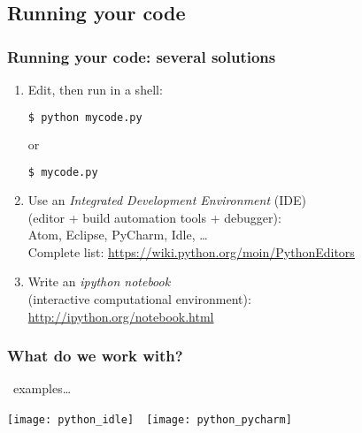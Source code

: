 \subsection{Running your code}
\begin{frame}[fragile, t]
\frametitle{Running your code: several solutions}

\begin{enumerate}
\item<1-> Edit, then run in a shell:
\begin{lstlisting}[language=bash]
$ python mycode.py
\end{lstlisting}
or 
\begin{lstlisting}[language=bash]
$ mycode.py
\end{lstlisting}



\item<2-> Use an \textit{Integrated Development Environment} (IDE)\\
(editor + build automation tools + debugger):\\
Atom, Eclipse, PyCharm, Idle, \ldots\\
Complete list: \url{https://wiki.python.org/moin/PythonEditors}
\item<3-> Write an \textit{ipython notebook}\\
(interactive computational environment):\\
\url{http://ipython.org/notebook.html} 
\end{enumerate}

\end{frame}

\begin{frame}[c]
\frametitle{What do we work with?}
\huge
\faLaptop~examples\ldots

\vfill 
\texttt{[image: python\_idle]}~~\texttt{[image: python\_pycharm]}

\end{frame}
